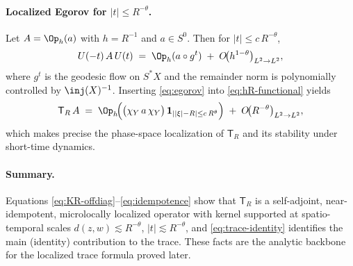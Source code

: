 \paragraph{Localized Egorov for $|t|\le R^{-\theta}$.}
Let $A=\Op_h(a)$ with $h=R^{-1}$ and $a\in S^0$. Then for $|t|\le c\,R^{-\theta}$,
\begin{equation}\label{eq:egorov}
  U(-t)\,A\,U(t) \;=\; \Op_h(a\circ g^t) \;+\; O\!\big(h^{1-\theta}\big)_{L^2\to L^2},
\end{equation}
where $g^t$ is the geodesic flow on $S^*X$ and the remainder norm is polynomially
controlled by $\inj(X)^{-1}$. Inserting \eqref{eq:egorov} into \eqref{eq:hR-functional} yields
\begin{equation}\label{eq:commute-AR}
  \mathsf{T}_R\,A \;=\; \Op_h\!\Big( \big(\chi_Y\,a\,\chi_Y\big)\,\mathbf{1}_{||\xi|-R|\le c\,R^\theta} \Big)
  \;+\; O\!\big(R^{-\theta}\big)_{L^2\to L^2},
\end{equation}
which makes precise the phase-space localization of $\mathsf{T}_R$ and its stability under
short-time dynamics.

\paragraph{Summary.}
Equations \eqref{eq:KR-offdiag}–\eqref{eq:idempotence} show that $\mathsf{T}_R$ is a
self-adjoint, near-idempotent, microlocally localized operator with kernel supported at
spatio-temporal scales $d(z,w)\lesssim R^{-\theta}$, $|t|\lesssim R^{-\theta}$, and
\eqref{eq:trace-identity} identifies the main (identity) contribution to the trace.
These facts are the analytic backbone for the localized trace formula proved later.
